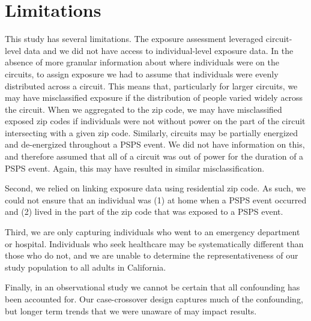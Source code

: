 \documentclass[../main.tex]{subfiles}
\begin{document}
\section{Limitations}
This study has several limitations. The exposure assessment leveraged circuit-level data and we did not have access to individual-level exposure data. In the absence of more granular information about where individuals were on the circuits, to assign exposure we had to assume that individuals were evenly distributed across a circuit. This means that, particularly for larger circuits, we may have misclassified exposure if the distribution of people varied widely across the circuit. When we aggregated to the zip code, we may have misclassified exposed zip codes if individuals were not without power on the part of the circuit intersecting with a given zip code. Similarly, circuits may be partially energized and de-energized throughout a PSPS event. We did not have information on this, and therefore assumed that all of a circuit was out of power for the duration of a PSPS event. Again, this may have resulted in similar misclassification. 

Second, we relied on linking exposure data using residential zip code. As such, we could not ensure that an individual was (1) at home when a PSPS event occurred and (2) lived in the part of the zip code that was exposed to a PSPS event. 

Third, we are only capturing individuals who went to an emergency department or hospital. Individuals who seek healthcare may be systematically different than those who do not, and we are unable to determine the representativeness of our study population to all adults in California. 

Finally, in an observational study we cannot be certain that all confounding has been accounted for. Our case-crossover design captures much of the confounding, but longer term trends that we were unaware of may impact results.
\end{document}
